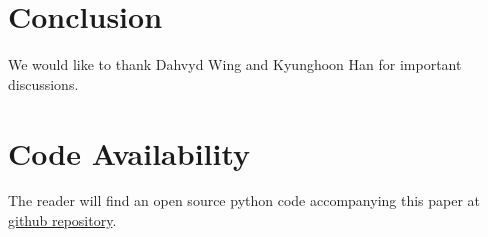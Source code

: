 \documentclass[reprint, amsmath, amssymb, aps]{revtex4-2}
\begin{document}
\section{Conclusion}

\begin{acknowledgments}

    We would like to thank Dahvyd Wing and Kyunghoon Han for important discussions.

\end{acknowledgments}

\section*{Code Availability}

The reader will find an open source python code accompanying this paper at \href{https://github.com/MatthieuSarkis/qdo}{github repository}.

\appendix

\nocite{*}


\end{document}
